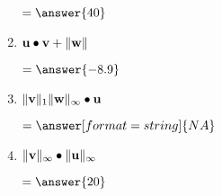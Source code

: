 \documentclass{ximera}
\begin{document}
\begin{exercise}
\begin{enumerate}
\begin{prompt}
        $=\answer{40}$
      \end{prompt}
    \item $\mathbf{u} \bullet \mathbf{v} + \|\mathbf{w}\|$
      \begin{prompt}
        $=\answer{-8.9}$
      \end{prompt}
    \item $\|\mathbf{v}\|_{1} \|\mathbf{w}\|_{\infty} \bullet \mathbf{u}$
      \begin{prompt}
        $=\answer[format=string]{NA}$
      \end{prompt}
    \item $\|\mathbf{v}\|_{\infty} \bullet \|\mathbf{u}\|_{\infty}$
      \begin{prompt}
        $=\answer{20}$
      \end{prompt}
      \pdfOnly{\end{multicols}}
  \end{enumerate}
\end{exercise}
\end{document}
